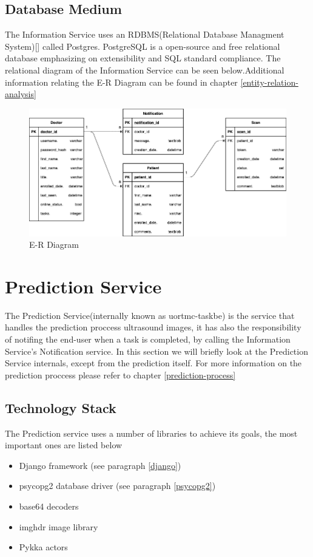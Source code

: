 		\subsection{Database Medium}
			The Information Service uses an RDBMS(Relational Database Managment System)[\cite{friedrichsen_ruffolo_monk_starks_pratt_last_1995}] called Postgres. PostgreSQL is a open-source and 
			free relational database emphasizing on extensibility and SQL standard compliance. The relational diagram of the Information Service
			can be seen below.Additional information relating the E-R Diagram can be found in chapter \ref{entity-relation-analysis} \pagebreak
			\begin{figure}[H]
				\iftrue
				\caption{E-R Diagram}
				\centering
				\includegraphics[angle=90,origin=c,scale=0.8]{figures/InformationServiceDatabaseDiagram}
				\fi
			\end{figure}\pagebreak
	
	\section{Prediction Service}
		The Prediction Service(internally known as uortmc-taskbe) is the service that handles the prediction proccess ultrasound images, it has 
		also the responsibility of notifing the end-user when a task is completed, by calling the Information Service's Notification service.
		In this section we will briefly look at the Prediction Service internals, except from the prediction itself. For more information on the
		prediction proccess please refer to chapter \ref{prediction-process}
		\subsection{Technology Stack}
			The Prediction service uses a number of libraries to achieve its goals, the most important ones are listed below
			\begin{itemize}
				\item Django framework (see paragraph \ref{django})
				\item psycopg2 database driver (see paragraph \ref{psycopg2})
				\item base64 decoders
				\item imghdr image library
				\item Pykka actors
			\end{itemize}
